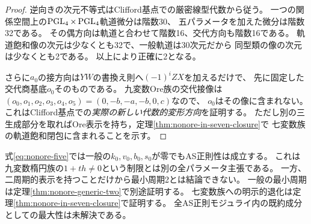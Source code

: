 \begin{proof}
逆向きの次元不等式はClifford基点での厳密線型代数から従う。
一つの関係空間上の$\operatorname{PGL}_4\times\operatorname{PGL}_4$軌道微分は階数30、
五パラメータを加えた微分は階数32である。
その偶方向は軌道と合わせて階数16、交代方向も階数16である。
軌道飽和像の次元は少なくとも32で、一般軌道は30次元だから
同型類の像の次元は少なくとも2である。
以上により正確に2となる。

さらに$a_0$の接方向は$YW$の書換え則へ$(-1)^iZX$を加えるだけで、
先に固定した交代商基底$o_0$そのものである。
九変数Ore族の交代接像は
$(o_0,o_1,o_2,o_3,o_4,o_5)=(0,-b,-a,-b,0,c)$なので、
$o_0$はその像に含まれない。
これはClifford基点での\emph{実際の新しい代数的変形方向}を証明する。
ただし別の三生成部分を取ればOre表示を持ち，定理\ref{thm:nonore-in-seven-closure}で
七変数族の軌道飽和閉包に含まれることを示す。
\end{proof}

\begin{remark}
式\eqref{eq:nonore-five}では一般の$k_0,v_0,b_0,s_0$が零でもAS正則性は成立する。
これは九変数楕円族の$1+th\ne0$という制限とは別の全パラメータ主張である。
一方、二周期的表示を持つことだけから最小周期2とは結論できない。
一般の最小周期は定理\ref{thm:nonore-generic-two}で別途証明する。
七変数族への明示的退化は定理\ref{thm:nonore-in-seven-closure}で証明する。
全AS正則モジュライ内の既約成分としての最大性は未解決である。
\end{remark}
